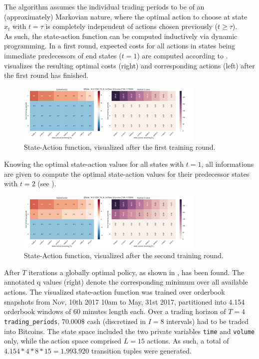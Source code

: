 The algorithm assumes the individual trading periods to be of an (approximately) Markovian nature, where the optimal action to choose at state $x_t$ with $t = \tau$ is completely independent of actions chosen previously ($t \geq \tau$).\\

As such, the state-action function can be computed inductively via dynamic programming. In a first round, expected costs for all actions in states being immediate predecessors of end states (\ie $t=1$) are computed according to .  visualizes the resulting optimal costs (right) and corresponding actions (left) after the first round has finished.

\begin{figure}[ht]
	\centering
   \includegraphics[width=0.8\textwidth]{content/drawings/heatmap_3months_t1}
	\caption{State-Action function, visualized after the first training round.}
	\label{fig:heatmap:t1}
\end{figure}

Knowing the optimal state-action values for all states with $t=1$, all informations are given to compute the optimal state-action values for their predecessor states with $t=2$ (see ).

\begin{figure}[ht]
	\centering
   \includegraphics[width=0.8\textwidth]{content/drawings/heatmap_3months_t2}
	\caption{State-Action function, visualized after the second training round.}
	\label{fig:heatmap:t2}
\end{figure}

After $T$ iterations a globally optimal policy, as shown in , has been found. The annotated q values (right) denote the corresponding minimum over all available actions. The visualized state-action function was trained over orderbook snapshots from Nov, 10th 2017 10am to May, 31st 2017, partitioned into 4.154 orderbook windows of 60 minutes length each. Over a trading horizon of $T=4$ \lstinline!trading_periods!, $70.000\$$ cash (discretized in $I=8$ intervals) had to be traded into Bitcoins. The state space included the two private variables \lstinline!time! and \lstinline!volume! only, while the action space comprised $L=15$ actions. As such, a total of $4.154 * 4 * 8 * 15 = 1.993.920$ transition tuples were generated.

